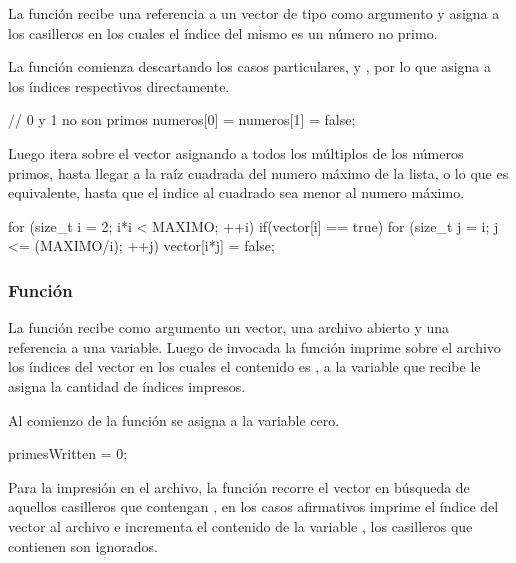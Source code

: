 \documentclass[12pt]{article}
\newenvironment{fullgrayverb}
{\verbbox}
{\endverbbox\par\colorbox{gray!25}{\parbox{\textwidth}{\theverbbox}}\par}
\begin{document}
La función  recibe una referencia a un vector de
tipo  como argumento y asigna  a los casilleros en los
cuales el índice del mismo es un número no primo. 

La función comienza descartando los casos particulares,  y , por
lo que asigna  a los índices respectivos directamente.

\begin{fullgrayverb}[\mbox{}]
// 0 y 1 no son primos
numeros[0] = numeros[1] = false;
\end{fullgrayverb}

Luego itera sobre el vector asignando  a todos los múltiplos de los
números primos, hasta llegar a la raíz cuadrada del numero máximo de la lista, o
lo que es equivalente, hasta que el indice al cuadrado sea menor al numero
máximo.

\begin{fullgrayverb}[\mbox{}]
for (size_t i = 2; i*i < MAXIMO; ++i) {
    if(vector[i] == true) {
        for (size_t j = i; j <= (MAXIMO/i); ++j) {
            vector[i*j] = false;
        }
    }
}
\end{fullgrayverb}

\subsubsection{Función }

La función  recibe como argumento un vector, una
archivo abierto y una referencia a una variable. Luego de invocada la función
imprime sobre el archivo los índices del vector en los cuales el contenido es
, a la variable que recibe le asigna la cantidad de índices impresos.

Al comienzo de la función se asigna a la variable  cero.

\begin{fullgrayverb}[\mbox{}]
primesWritten = 0;
\end{fullgrayverb}

Para la impresión en el archivo, la función recorre el vector en búsqueda de
aquellos casilleros que contengan , en los casos afirmativos imprime
el índice del vector al archivo e incrementa el contenido de la variable
, los casilleros que contienen  son ignorados.
\end{document}
